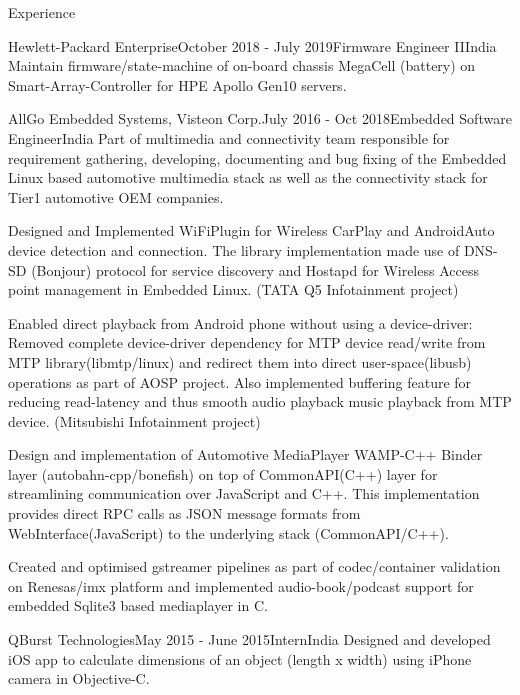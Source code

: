 \documentclass[
	a4paper, %
	11pt, %
]{resume} %
\begin{document}
\begin{rSection}{Experience}
\begin{rSubsection}{Hewlett-Packard Enterprise}{October 2018 - July 2019}{Firmware Engineer II}{India}
            Maintain firmware/state-machine of on-board chassis MegaCell (battery) on Smart-Array-Controller for HPE
Apollo Gen10 servers.


	\end{rSubsection}

	\begin{rSubsection}{AllGo Embedded Systems, Visteon Corp.}{July 2016 - Oct 2018}{Embedded Software Engineer}{India}
            Part of multimedia and connectivity team responsible for requirement gathering, developing, documenting and bug fixing of the Embedded Linux based automotive multimedia stack as well as the connectivity stack for Tier1 automotive OEM companies.

            Designed and Implemented WiFiPlugin for Wireless CarPlay and AndroidAuto device detection and connection. The library implementation made use of DNS-SD (Bonjour) protocol for service discovery and Hostapd for Wireless Access point management in Embedded Linux. (TATA Q5 Infotainment project) \hfill
            
            Enabled direct playback from Android phone without using a device-driver: Removed complete device-driver dependency for MTP device read/write from MTP library(libmtp/linux) and redirect them into direct user-space(libusb) operations as part of AOSP project. Also implemented buffering feature for reducing read-latency and thus smooth audio playback music playback from MTP device. (Mitsubishi Infotainment project) \hfill

            Design and implementation of Automotive MediaPlayer WAMP-C++ Binder layer (autobahn-cpp/bonefish) on top of CommonAPI(C++) layer for streamlining communication over JavaScript and C++. This implementation provides direct RPC calls as JSON message formats from WebInterface(JavaScript) to the underlying stack (CommonAPI/C++).

            Created and optimised gstreamer pipelines as part of codec/container validation on Renesas/imx platform and implemented audio-book/podcast support for embedded Sqlite3 based mediaplayer in C.

	\end{rSubsection}

	\begin{rSubsection}{QBurst Technologies}{May 2015 - June 2015}{Intern}{India}
            Designed and developed iOS app to calculate dimensions of an object (length x width) using iPhone camera in Objective-C.

	\end{rSubsection}
 
\end{rSection}
\end{document}

